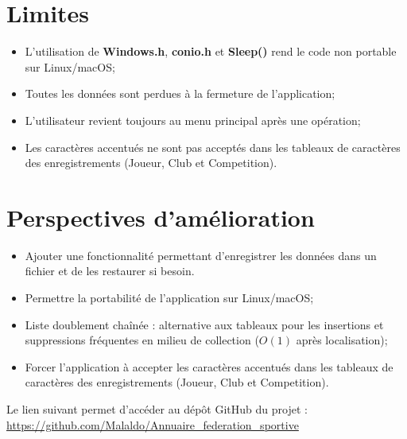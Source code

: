 \documentclass[12pt,a4paper]{report}
\begin{document}
\section{Limites}
\begin{itemize}
	\item L'utilisation de \textbf{Windows.h}, \textbf{conio.h} et \textbf{Sleep()} rend le code non portable sur Linux/macOS;
	\item Toutes les données sont perdues à la fermeture de l'application;
	\item L'utilisateur revient toujours au menu principal après une opération; 
	\item Les caractères accentués ne sont pas acceptés dans les tableaux de caractères des enregistrements (Joueur, Club et Competition).
\end{itemize}
\section{Perspectives d'amélioration}
\begin{itemize}
	\item Ajouter une fonctionnalité permettant d'enregistrer les données dans un fichier et de les restaurer si besoin.
	\item Permettre la portabilité de l'application sur Linux/macOS;
	\item Liste doublement chaînée : alternative aux tableaux pour les insertions et suppressions fréquentes en milieu de collection ($O(1)$ après localisation);
	\item Forcer l'application à accepter les caractères accentués dans les tableaux de caractères des enregistrements (Joueur, Club et Competition).
\end{itemize}
Le lien suivant permet d'accéder au dépôt GitHub du projet : \\
\url{https://github.com/Malaldo/Annuaire_federation_sportive}
\end{document}
